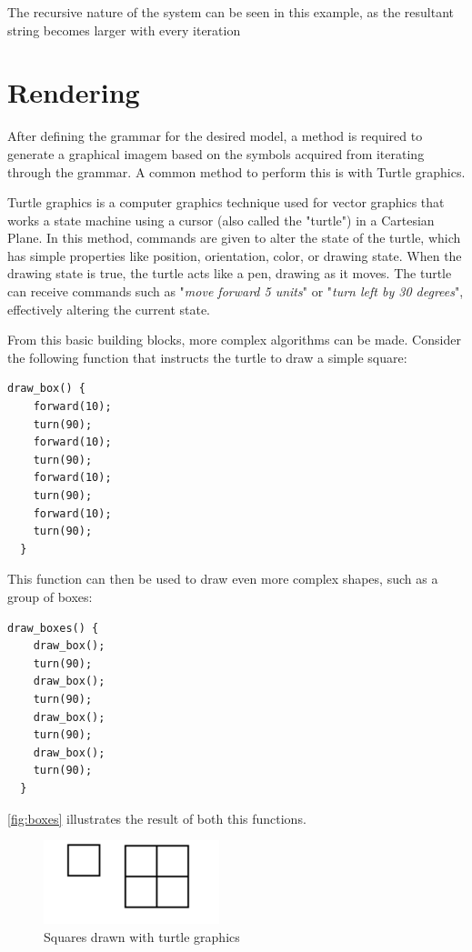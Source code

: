 \documentclass{acmtog}
\begin{document}
The recursive nature of the system can be seen in this example, as the resultant string becomes larger with every iteration

\section{Rendering}
\label{sec:rendering}

After defining the grammar for the desired model, a method is required to generate a graphical imagem based on the symbols acquired from iterating through the grammar. A common method to perform this is with Turtle graphics.

Turtle graphics is a computer graphics technique used for vector graphics that works a state machine using a cursor (also called the "turtle") in a Cartesian Plane. In this method, commands are given to alter the state of the turtle, which has simple properties like position, orientation, color, or drawing state. When the drawing state is true, the turtle acts like a pen, drawing as it moves. The turtle can receive commands such as "\textit{move forward 5 units}" or "\textit{turn left by 30 degrees}", effectively altering the current state.

From this basic building blocks, more complex algorithms can be made. Consider the following function that instructs the turtle to draw a simple square:

\begin{lstlisting}[label={lst:square}]
  draw_box() {
    forward(10);
    turn(90);
    forward(10);
    turn(90);
    forward(10);
    turn(90);
    forward(10);
    turn(90); 
  }
\end{lstlisting}

This function can then be used to draw even more complex shapes, such as a group of boxes:

\begin{lstlisting}[caption={},label={lst:squares}]
  draw_boxes() {
    draw_box();
    turn(90);
    draw_box();
    turn(90);
    draw_box();
    turn(90);
    draw_box();
    turn(90);
  }
\end{lstlisting}

\autoref{fig:boxes} illustrates the result of both this functions.

\begin{figure}[!htp]
  \begin{center}
    \includegraphics{images/0_draw_box}
    \caption{Squares drawn with turtle graphics \label{fig:boxes}}
    \end{center}
\end{figure}
\end{document}
